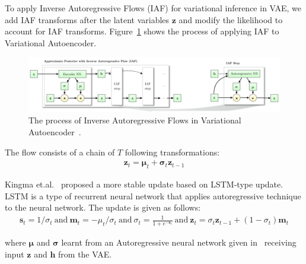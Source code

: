 \documentclass[runningheads]{llncs}
\begin{document}
To apply Inverse Autoregressive Flows (IAF) for variational inference in VAE, we add IAF transforms after the latent variables $\mathbf{z}$ and modify the likelihood to account for IAF transforms. Figure~\ref{fig:iaf} shows the process of applying IAF to Variational Autoencoder. 

\begin{figure}[htb]
	\centering
	\includegraphics[width=\textwidth]{imgs/iaf}
	\caption{The process of Inverse Autoregressive Flows in Variational Autoencoder~\cite{kingma2016improved}.}
	\label{fig:iaf}
\end{figure}

The flow consists of a chain of $T$ following transformations:
\begin{align}
\mathbf{z}_t = \bm{\mu}_t + \bm{\sigma}_t\mathbf{z}_{t-1}
\end{align}

Kingma et.al.~\cite{kingma2016improved} proposed a more stable update based on LSTM-type update. LSTM is a type of recurrent neural network that applies autoregressive technique to the neural network.  The update is given as follows:
\begin{align}
\mathbf{s}_t = 1 / \sigma_t\:\text{and}\:\mathbf{m}_t = -\mu_t / \sigma_t\:\text{and}\:\sigma_t = \frac{1}{1 + e^{-\mathbf{s}_t}}\:\text{and}\:\mathbf{z}_t = \sigma_t\mathbf{z}_{t-1} + (1 - \sigma_t)\mathbf{m}_{t} 
\end{align}

where $\bm{\mu}$ and $\bm{\sigma}$ learnt from an Autoregressive neural network given in~\cite{germain2015made} receiving input $\mathbf{z}$ and $\mathbf{h}$ from the VAE. 
\end{document}
